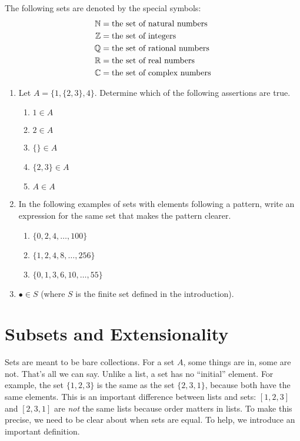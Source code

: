 \begin{defn}
	The following sets are denoted by the special symbols:
	\begin{align*}
		\mathbb N &= \text{the set of natural numbers}\\
		\mathbb Z &= \text{the set of integers}\\
		\mathbb Q &= \text{the set of rational numbers}\\
		\mathbb R &= \text{the set of real numbers}\\
		\mathbb C &= \text{the set of complex numbers}
	\end{align*}
\end{defn}

\begin{exercises}
	\begin{enumerate}
  \item Let $A = \{1,\{2,3\},4\}$. Determine which of the following assertions are true.
    \begin{enumerate}
    \item $1\in A$
    \item $2\in A$
    \item $\{\}\in A$
    \item $\{2,3\}\in A$
    \item $A\in A$
    \end{enumerate}
  \item In the following examples of sets with elements following a pattern, write an expression for the same set
  that makes the pattern clearer.
  \begin{enumerate}
  \item $\{0,2,4,\ldots, 100\}$
  \item $\{1,2,4,8,\ldots, 256\}$
  \item $\{0,1,3, 6, 10,\ldots, 55\}$
  \end{enumerate}
  \item $\bullet\in S$ (where $S$ is the finite set defined in the introduction).
  \end{enumerate}
\end{exercises}

\section{Subsets and Extensionality}

Sets are meant to be bare collections. 
For a set $A$, some things are in, some are not. 
That's all we can say.
Unlike a list, a set has no ``initial'' element.
For example, the set $\{1,2,3\}$ is the same as the set $\{2,3,1\}$, because both have the same elements. This is an important difference between
lists and sets: $[1,2,3]$ and $[2,3,1]$ are \emph{not} the same lists because order matters in lists. 
To make this precise, we need to be clear about when sets are equal. To help, we introduce an important definition.

